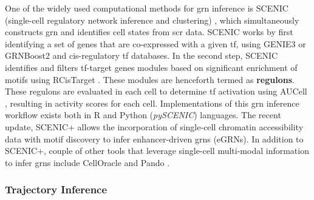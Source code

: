 \par One of the widely used computational methods for \gls{grn} inference is SCENIC (single-cell regulatory network inference and clustering) \textbf{\cite{aibar_scenic_2017,van_de_sande_scalable_2020}}, which simultaneously constructs \gls{grn} and identifies cell states from \gls{scr} data. SCENIC works by first identifying a set of genes that are co-expressed with a given \gls{tf}, using GENIE3 \textbf{\cite{huynh-thu_inferring_2010}} or GRNBoost2 \textbf{\cite{moerman_grnboost2_2019}} and cis-regulatory \gls{tf} databases. In the second step, SCENIC identifies and filters \gls{tf}-target genes modules based on significant enrichment of motifs using  RCisTarget \textbf{\cite{aibar_scenic_2017,aibar_rcistarget_nodate}}. These modules are henceforth termed as \textbf{regulons}. These regulons are evaluated in each cell to determine \gls{tf} activation using AUCell \textbf{\cite{aibar_scenic_2017,aibar_aucell_nodate}}, resulting in activity scores for each cell. Implementations of this \gls{grn} inference workflow exists both in R and Python (\textit{pySCENIC}) \textbf{\cite{kumar_inference_2021}} languages. The recent update, SCENIC+ \textbf{\cite{bravo_gonzalez-blas_scenic_2023}} allows the incorporation of single-cell chromatin accessibility data with motif discovery to infer enhancer-driven \glspl{grn} (eGRNs). In addition to SCENIC+, couple of other tools that leverage single-cell multi-modal information to infer \glspl{grn} include CellOracle \textbf{\cite{kamimoto_dissecting_2023}} and Pando \textbf{\cite{fleck_inferring_2023}}. 



\subsubsection{Trajectory Inference}
\label{subsubsec:chp1_int_trajectory}


